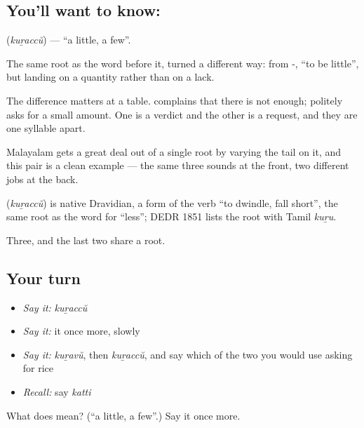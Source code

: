 \subsection*{You'll want to know: }
\textbf{} (\emph{kuṟaccŭ}) — \textquotedblleft{}a little, a few\textquotedblright{}.

The same root as the word before it, turned a different way: from -, \textquotedblleft{}to be little\textquotedblright{}, but landing on a quantity rather than on a lack.

The difference matters at a table.  complains that there is not enough;  politely asks for a small amount. One is a verdict and the other is a request, and they are one syllable apart.

Malayalam gets a great deal out of a single root by varying the tail on it, and this pair is a clean example — the same three sounds at the front, two different jobs at the back.

\begin{cousinweb}
\textbf{} (\emph{kuṟaccŭ}) is native Dravidian, a form of the verb \textquotedblleft{}to dwindle, fall short\textquotedblright{}, the same root as the word for \textquotedblleft{}less\textquotedblright{}; DEDR 1851 lists the root with Tamil \emph{kuṟu}.
\end{cousinweb}

\begin{grammarlens}[title={What you've built}]
Three, and the last two share a root.
\end{grammarlens}

\subsection*{Your turn}
\begin{itemize}
\raggedright
  \item \emph{Say it:} \emph{kuṟaccŭ}
  \item \emph{Say it:} it once more, slowly
  \item \emph{Say it:} \emph{kuṟavŭ}, then \emph{kuṟaccŭ}, and say which of the two you would use asking for rice
  \item \emph{Recall:} say \emph{katti}
\end{itemize}

\begin{tcolorbox}[breakable,colback=teal!4,colframe=teal!35!black,title={Before you move on}]
What does  mean? (\textquotedblleft{}a little, a few\textquotedblright{}.) Say it once more.
\end{tcolorbox}

